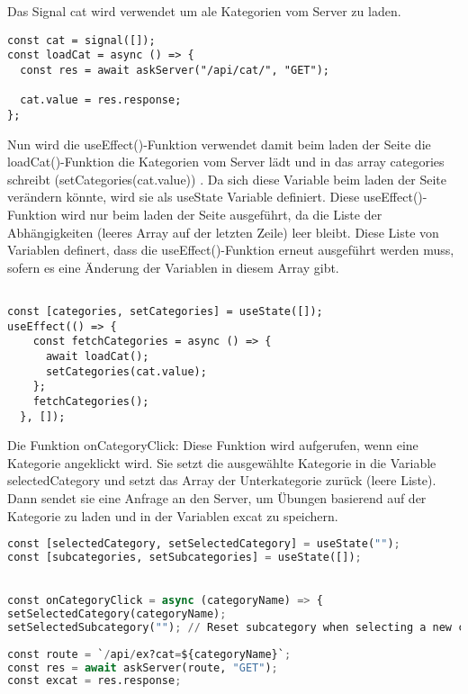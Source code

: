 \documentclass[12pt,a4paper]{article} %
\begin{document}
Das Signal cat wird verwendet um ale Kategorien vom Server zu laden.

\begin{lstlisting}
const cat = signal([]);
const loadCat = async () => {
  const res = await askServer("/api/cat/", "GET");

  cat.value = res.response;
};

\end{lstlisting}

Nun wird die useEffect()-Funktion verwendet damit beim laden der Seite die loadCat()-Funktion die Kategorien vom Server lädt und in das array categories schreibt (setCategories(cat.value)) . Da sich diese Variable beim laden der Seite verändern könnte, wird sie als useState Variable definiert. 
Diese useEffect()-Funktion wird nur beim laden der Seite ausgeführt, da die Liste der Abhängigkeiten (leeres Array auf der letzten Zeile) leer bleibt. Diese Liste von Variablen definert, dass die useEffect()-Funktion erneut ausgeführt werden muss, sofern es eine Änderung der Variablen in diesem Array gibt.
\begin{lstlisting}

const [categories, setCategories] = useState([]);
useEffect(() => {
    const fetchCategories = async () => {
      await loadCat();
      setCategories(cat.value);
    };
    fetchCategories();
  }, []);

\end{lstlisting}


Die Funktion onCategoryClick: Diese Funktion wird aufgerufen, wenn eine Kategorie angeklickt wird. Sie setzt die ausgewählte Kategorie in die Variable selectedCategory und setzt das Array der Unterkategorie zurück (leere Liste). Dann sendet sie eine Anfrage an den Server, um Übungen basierend auf der Kategorie zu laden und in der Variablen excat zu speichern.

\begin{lstlisting}[language=Python]
const [selectedCategory, setSelectedCategory] = useState("");
const [subcategories, setSubcategories] = useState([]);


const onCategoryClick = async (categoryName) => {
setSelectedCategory(categoryName);
setSelectedSubcategory(""); // Reset subcategory when selecting a new category
    
const route = `/api/ex?cat=${categoryName}`;
const res = await askServer(route, "GET");
const excat = res.response;
    
\end{lstlisting}
\end{document}
